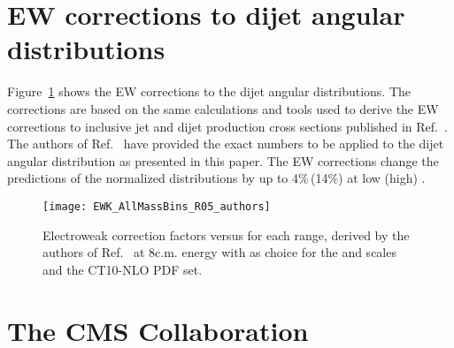 \documentclass[11pt,twoside,a4paper,cmspaper,final,collab]{cms-tdr}
\begin{document}
\appendix
\section{EW corrections to dijet angular distributions}
Figure~\ref{fig:ewk} shows the EW corrections to the dijet angular
distributions. The corrections are based on the same calculations and
tools used to derive the EW corrections to inclusive jet and dijet
production cross sections published in Ref.~\cite{Dittmaier:2012kx}.
The authors of Ref.~\cite{Dittmaier:2012kx} have provided the
exact numbers to be applied to the dijet angular distribution as
presented in this paper. The EW corrections change the predictions of
the normalized \chijj distributions by up to 4\%\,(14\%) at low (high)
\mjj.
\begin{figure}[htb]
  \centering
  \texttt{[image: EWK\_AllMassBins\_R05\_authors]}
  \caption{Electroweak correction factors versus \chijj for each \mjj
    range, derived by the authors of Ref.~\cite{Dittmaier:2012kx} at
    8\TeV c.m. energy with \avept as choice for the \mur and \muf
    scales and the CT10-NLO PDF set.}
  \label{fig:ewk}
\end{figure}



\cleardoublepage \section{The CMS Collaboration \label{app:collab}}\begin{sloppypar}\end{sloppypar}
\end{document}
